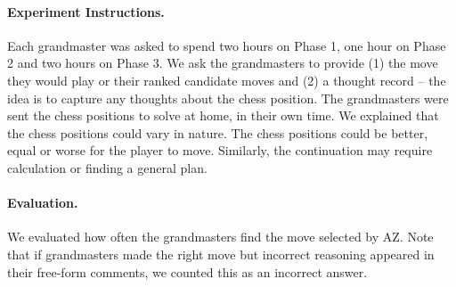 \documentclass{article}
\begin{document}
\paragraph{Experiment Instructions.}
Each grandmaster was asked to spend two hours on Phase 1, one hour on Phase 2 and two hours on Phase 3. We ask the grandmasters to provide (1) the move they would play or their ranked candidate moves and (2) a thought record -- the idea is to capture any thoughts about the chess position.
The grandmasters were sent the chess positions to solve at home, in their own time. 
We explained that the chess positions could vary in nature. The chess positions could be better, equal or worse for the player to move. Similarly, the continuation may require calculation or finding a general plan. 

\paragraph{Evaluation.}
We evaluated how often the grandmasters find the move selected by AZ. 
Note that if grandmasters made the right move but incorrect reasoning appeared in their free-form comments, we counted this as an incorrect answer.
\end{document}
